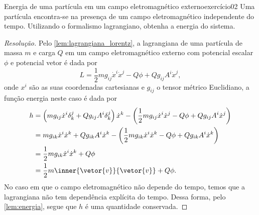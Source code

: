 \begin{exercício}{Energia de uma partícula em um campo eletromagnético externo}{exercício02}
    Uma partícula encontra-se na presença de um campo eletromagnético independente do tempo. Utilizando o formalismo lagrangiano, obtenha a energia do sistema.
\end{exercício}
\begin{proof}[Resolução]
    Pelo \cref{lem:lagrangiana_lorentz}, a lagrangiana de uma partícula de massa \(m\) e carga \(Q\) em um campo eletromagnético externo com potencial escalar \(\phi\) e potencial vetor  é dada por
    \begin{equation*}
        L = \frac12 m g_{ij} \dot{x}^i \dot{x}^j - Q\phi + Q g_{ij} A^i \dot{x}^j,
    \end{equation*}
    onde \(x^i\) são as suas coordenadas cartesianas e \(g_{ij}\) o tensor métrico Euclidiano, a função energia neste caso é dada por
    \begin{align*}
        h &= \left(mg_{ij} \dot{x}^i \delta^j_k + Q g_{ij} A^i \delta^j_k\right)\dot{x}^k - \left( \frac12 m g_{ij} \dot{x}^i \dot{x}^j - Q\phi +Q g_{ij} A^i \dot{x}^j\right)\\
          &= m g_{ik}\dot{x}^i \dot{x}^k + Qg_{ik}A^i\dot{x}^k - \left(\frac12 m g_{ik} \dot{x}^i \dot{x}^k - Q\phi + Qg_{ik} A^i \dot{x}^k\right)\\
          &= \frac12 m g_{ik} \dot{x}^i\dot{x}^k + Q\phi\\
          &= \frac12 m \inner{\vetor{v}}{\vetor{v}} + Q\phi.
    \end{align*}
    No caso em que o campo eletromagnético não depende do tempo, temos que a lagrangiana não tem dependência explícita do tempo. Dessa forma, pelo \cref{lem:energia}, segue que \(h\) é uma quantidade conservada.
\end{proof}
